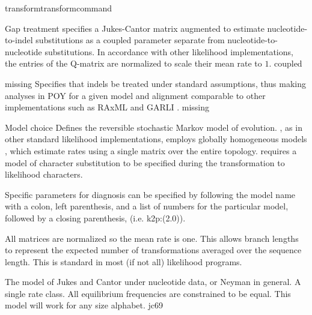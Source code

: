 \begin{command}{transform}{transformcommand}
\begin{arguments}
\begin {argumentgroup} {Gap treatment}
{                specifies a Jukes-Cantor matrix augmented to
                estimate nucleotide-to-indel substitutions as a
                coupled parameter separate from
                nucleotide-to-nucleotide substitutions. In
                accordance with other likelihood implementations,
                the entries of the Q-matrix are normalized
                to scale their mean rate to $ 1 $.}
                {coupled}
                
             {\obligatory missing}
                {Specifies that indels be treated under standard
                assumptions, thus making analyses in POY for a given
                model and alignment comparable to other
                implementations such as RAxML \cite{stamatakis2006} and 
                GARLI \cite{zwickl2006}.}
                {missing}

        \end {argumentgroup}                         
      

        \begin {argumentgroup} {Model choice}
            Defines the reversible stochastic Markov model of evolution.
            \poy, as in other standard likelihood implementations,
            employs globally homogeneous models \cite{jayaswal2005estimation}, which
            estimate rates using a single matrix over the entire topology.
            \poy requires a model of character substitution to be specified
            during the transformation to likelihood characters.

            Specific parameters for diagnosis can be specified by following
            the model name with a colon, left parenthesis, and a list of
            numbers for the particular model, followed by a closing
            parenthesis, (i.e. k2p:(2.0)).

            \begin{statement}
                All matrices are normalized so the mean rate is one. This
                allows branch lengths to represent the expected number of
                transformations averaged over the sequence length. This is
                standard in most (if not all) likelihood programs.
            \end{statement}

                {The model of Jukes and Cantor \cite{jukesandcantor1969}
                under nucleotide data, or Neyman \cite{neyman1971} in general. A
                single rate class. All equilibrium frequencies are
                constrained to be equal. This model will work for any size
                alphabet.}
                {jc69}


\end{argumentgroup}
\end{arguments}
\end{command}
